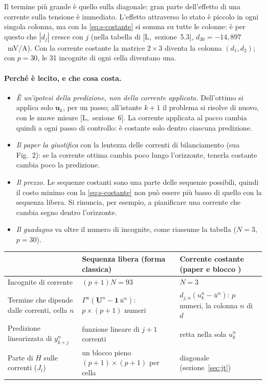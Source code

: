 \documentclass[11pt,a4paper]{article}
\newcommand{\file}[1]{\texttt{\detokenize{#1}}}
\newcommand{\uno}{\mathbf{1}}
\newcommand{\vett}[1]{\boldsymbol{#1}}      %
\begin{document}
Il termine più grande è quello sulla diagonale: gran parte dell'effetto di una
corrente sulla tensione è immediato. L'effetto attraverso lo stato è piccolo
in ogni singola colonna, ma con la \eqref{eq:s-costante} si somma su tutte le
colonne: è per questo che $|d_j|$ cresce con $j$ (nella tabella di
[L,~sezione~5.3], $d_{30} = -14{,}897$~mV/A). Con la corrente costante la
matrice $2 \times 3$ diventa la colonna $(d_1, d_2)$; con $p = 30$, le 31
incognite di ogni cella diventano una.

\paragraph{Perché è lecito, e che cosa costa.}
\begin{itemize}
  \item \emph{È un'ipotesi della predizione, non della corrente applicata.}
        Dell'ottimo si applica solo $\vett{u}_k$, per un passo; all'istante $k+1$ il
        problema si risolve di nuovo, con le nuove misure [L,~sezione~6]. La
        corrente applicata al pacco cambia quindi a ogni passo di controllo: è
        costante solo dentro ciascuna predizione.
  \item \emph{Il paper la giustifica} con la lentezza delle correnti di
        bilanciamento (sua Fig.~2): se la corrente ottima cambia poco lungo
        l'orizzonte, tenerla costante cambia poco la predizione.
  \item \emph{Il prezzo.} Le sequenze costanti sono una parte delle sequenze
        possibili, quindi il costo minimo con la \eqref{eq:s-costante} non può
        essere più basso di quello con la sequenza libera. Si rinuncia, per
        esempio, a pianificare una corrente che cambia segno dentro
        l'orizzonte.
  \item \emph{Il guadagno} va oltre il numero di incognite, come riassume la
        tabella ($N = 3$, $p = 30$).
\end{itemize}
\begin{center}
\begin{tabular}{p{3.9cm}p{4.9cm}p{4.9cm}}
\toprule
 & \raggedright Sequenza libera (forma classica) &
   \raggedright Corrente costante (paper e blocco \file{Problema_QP})
   \tabularnewline
\midrule
\raggedright Incognite di corrente &
  \raggedright $(p+1)N = 93$ &
  $N = 3$ \tabularnewline[3pt]
\raggedright Termine che dipende dalle correnti, cella $n$ &
  \raggedright $\Gamma^n(\vett{U}^n - \uno\,\bar u^n)$: $p \times (p+1)$ numeri &
  \raggedright $d_{j,n}(u^n_k - \bar u^n)$: $p$ numeri, la colonna $n$ di $d$
  \tabularnewline[3pt]
\raggedright Predizione linearizzata di $y^n_{k+j}$ &
  \raggedright funzione lineare di $j+1$ correnti &
  retta nella sola $u^n_k$ \tabularnewline[3pt]
\raggedright Parte di $H$ sulle correnti ($J_t$) &
  \raggedright un blocco pieno $(p+1) \times (p+1)$ per cella &
  diagonale (sezione~\ref{sec:jt}) \tabularnewline
\bottomrule
\end{tabular}
\end{center}
\end{document}
